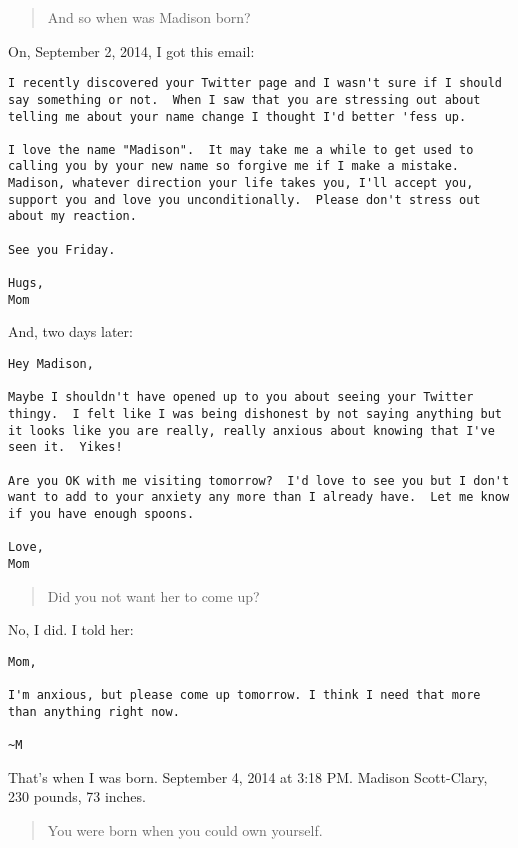 \begin{quote}
And so when was Madison born?
\end{quote}

On, September 2, 2014, I got this email:

\begin{verbatim}
I recently discovered your Twitter page and I wasn't sure if I should say something or not.  When I saw that you are stressing out about telling me about your name change I thought I'd better 'fess up.  

I love the name "Madison".  It may take me a while to get used to calling you by your new name so forgive me if I make a mistake.  Madison, whatever direction your life takes you, I'll accept you, support you and love you unconditionally.  Please don't stress out about my reaction.

See you Friday.

Hugs,
Mom
\end{verbatim}

And, two days later:

\begin{verbatim}
Hey Madison,

Maybe I shouldn't have opened up to you about seeing your Twitter thingy.  I felt like I was being dishonest by not saying anything but it looks like you are really, really anxious about knowing that I've seen it.  Yikes!  

Are you OK with me visiting tomorrow?  I'd love to see you but I don't want to add to your anxiety any more than I already have.  Let me know if you have enough spoons.

Love,
Mom
\end{verbatim}

\begin{quote}
Did you not want her to come up?
\end{quote}

No, I did. I told her:

\begin{verbatim}
Mom,

I'm anxious, but please come up tomorrow. I think I need that more than anything right now.

~M
\end{verbatim}

That's when I was born. September 4, 2014 at 3:18 PM. Madison Scott-Clary, 230 pounds, 73 inches.

\begin{quote}
You were born when you could own yourself.
\end{quote}


